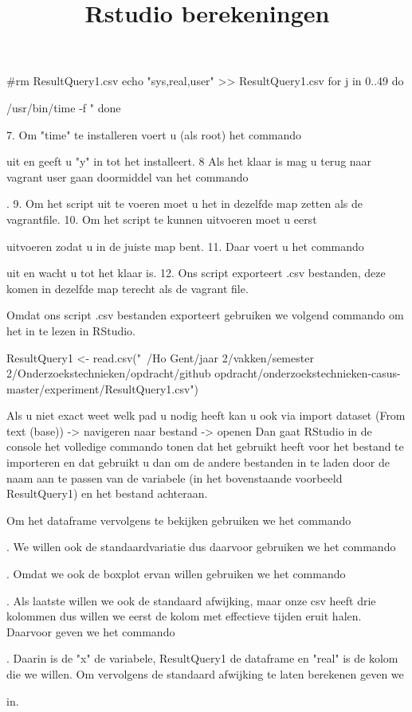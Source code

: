 \documentclass[fleqn,10pt]{artikeltin}
\begin{document}
\#rm ResultQuery1.csv
echo "sys,real,user" >> ResultQuery1.csv
for j in {0..49}
do
{ /usr/bin/time -f "%
done 

7. Om "time" te installeren voert u (als root) het commando \par uit en geeft u "y" in tot het installeert.
8 Als het klaar is mag u terug naar vagrant user gaan doormiddel van het commando \par . 
9. Om het script uit te voeren moet u het in dezelfde map zetten als de vagrantfile.
10. Om het script te kunnen uitvoeren moet u eerst \par uitvoeren zodat u in de juiste map bent.
11. Daar voert u het commando \par uit en wacht u tot het klaar is.
12. Ons script exporteert .csv bestanden, deze komen in dezelfde map terecht als de vagrant file.

\title{Rstudio berekeningen}

Omdat ons script .csv bestanden exporteert gebruiken we volgend commando om het in te lezen in RStudio.

ResultQuery1 <- read.csv("~/Ho Gent/jaar 2/vakken/semester 2/Onderzoekstechnieken/opdracht/github opdracht/onderzoekstechnieken-casus-master/experiment/ResultQuery1.csv")

Als u niet exact weet welk pad u nodig heeft kan u ook via import dataset (From text (base)) -> navigeren naar bestand -> openen
Dan gaat RStudio in de console het volledige commando tonen dat het gebruikt heeft voor het bestand te importeren en dat gebruikt u dan om de andere bestanden in te laden door de naam aan te passen van de variabele (in het bovenstaande voorbeeld ResultQuery1) en het bestand achteraan.

Om het dataframe vervolgens te bekijken gebruiken we het commando \par.
We willen ook de standaardvariatie dus daarvoor gebruiken we het commando \par.
Omdat we ook de boxplot ervan willen gebruiken we het commando \par.
Als laatste willen we ook de standaard afwijking, maar onze csv heeft drie kolommen dus willen we eerst de kolom met effectieve tijden eruit halen. Daarvoor geven we het commando \par. Daarin is de "x" de variabele, ResultQuery1 de dataframe en "real" is de kolom die we willen.
Om vervolgens de standaard afwijking te laten berekenen geven we \par in.

}
\end{document}
